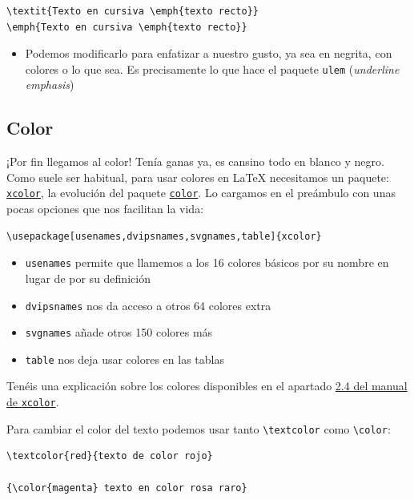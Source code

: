 \begin{lstlisting}[language={[latex]tex}]
\textit{Texto en cursiva \emph{texto recto}}
\emph{Texto en cursiva \emph{texto recto}} 
\end{lstlisting}

\begin{itemize}
\itemsep1pt\parskip0pt
\item
  Podemos modificarlo para enfatizar a nuestro gusto, ya sea en negrita,
  con colores o lo que sea. Es precisamente lo que hace el paquete
  \lstinline!ulem! (\emph{underline emphasis})
\end{itemize}

\subsection{Color}\label{sec:color}

¡Por fin llegamos al color! Tenía ganas ya, es cansino todo en blanco y
negro. Como suele ser habitual, para usar colores en LaTeX necesitamos
un paquete: \href{http://www.ctan.org/pkg/xcolor}{\lstinline!xcolor!},
la evolución del paquete
\href{https://www.ctan.org/pkg/color}{\lstinline!color!}. Lo cargamos en
el preámbulo con unas pocas opciones que nos facilitan la vida:

\begin{lstlisting}[language={[latex]tex}]
\usepackage[usenames,dvipsnames,svgnames,table]{xcolor}
\end{lstlisting}

\begin{itemize}
\item
  \lstinline!usenames! permite que llamemos a los 16 colores básicos por
  su nombre en lugar de por su definición
\item
  \lstinline!dvipsnames! nos da acceso a otros 64 colores extra
\item
  \lstinline!svgnames! añade otros 150 colores más
\item
  \lstinline!table! nos deja usar colores en las tablas
\end{itemize}

Tenéis una explicación sobre los colores disponibles en el apartado
\href{http://osl.ugr.es/CTAN/macros/latex/contrib/xcolor/xcolor.pdf}{2.4
del manual de \lstinline!xcolor!}.

Para cambiar el color del texto podemos usar tanto
\lstinline!\textcolor! como \lstinline!\color!:

\begin{lstlisting}[language={[latex]tex}]
\textcolor{red}{texto de color rojo}

{\color{magenta} texto en color rosa raro}
\end{lstlisting}

